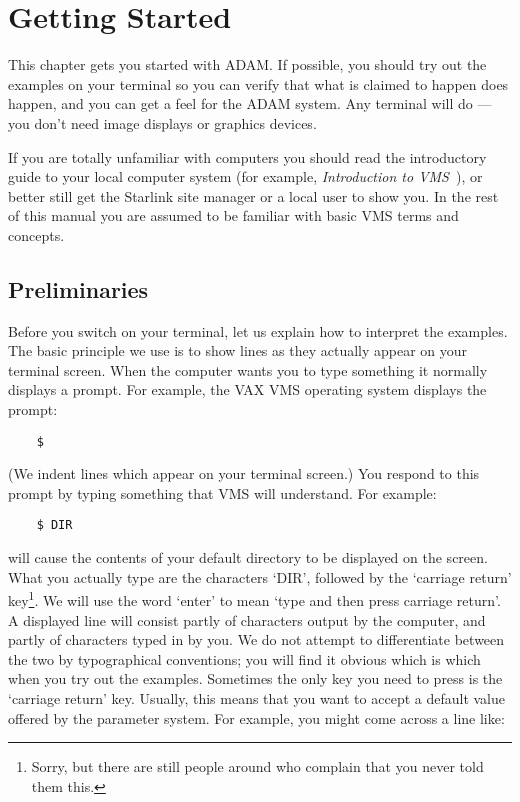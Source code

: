 \chapter{Getting Started}
\label{C_getstart}

This chapter gets you started with ADAM.
If possible, you should try out the examples on your terminal so you can
verify that what is claimed to happen does happen, and you can get a feel for
the ADAM system.
Any terminal will do --- you don't need image displays or graphics devices.

If you are totally unfamiliar with computers you should read
the introductory guide to your local computer system (for example, {\em
Introduction to VMS}~), or better still get the Starlink site manager or a
local user to show you.
In the rest of this manual you are assumed to be familiar with basic VMS
terms and concepts.

\section{Preliminaries}
\label{S_prelim}

Before you switch on your terminal, let us explain how to interpret the
examples.
The basic principle we use is to show lines as they actually appear on your
terminal screen.
When the computer wants you to type something it normally displays a prompt.
For example, the VAX VMS operating system displays the prompt:

\begin{small}
\begin{verbatim}
    $
\end{verbatim}
\end{small}

(We indent lines which appear on your terminal screen.)
You respond to this prompt by typing something that VMS will understand.
For example:

\begin{small}
\begin{verbatim}
    $ DIR
\end{verbatim}
\end{small}

will cause the contents of your default directory to be displayed on the
screen.
What you actually type are the characters `DIR', followed by the `carriage
return' key\footnote{Sorry, but there are still people around who complain
that you never told them this.}.
We will use the word `enter' to mean `type and then press carriage return'.
A displayed line will consist partly of characters output by the
computer, and partly of characters typed in by you.
We do not attempt to differentiate between the two by typographical conventions;
you will find it obvious which is which when you try out the examples.
Sometimes the only key you need to press is the `carriage return' key.
Usually, this means that you want to accept a default value offered by
the parameter system.
For example, you might come across a line like:


